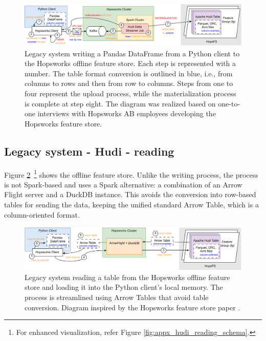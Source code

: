 \begin{figure}
    \begin{center}
      \includegraphics[width=\textwidth]{figures/2-background_and_related_work/hudi_write.png}
    \end{center}
    \caption[Legacy system - Hudi - write process]{Legacy system writing a Pandas DataFrame from a Python client to the Hopsworks offline feature store. Each step is represented with a number. The table format conversion is outlined in blue, i.e., from columns to rows and then from row to columns. Steps from one to four represent the upload process, while the materialization process is complete at step eight. The diagram was realized based on one-to-one interviews with Hopsworks AB employees developing the Hopsworks feature store.}
    \label{fig:hudi_write}
\end{figure}



\subsection{Legacy system - Hudi - reading}
\label{subsec:back_sys_hudi_read}

Figure \ref{fig:hudi_read}~\footnote{For enhanced visualization, refer Figure \ref{fig:appx_hudi_reading_schema}.}  shows the offline feature store. Unlike the writing process, the process is not Spark-based and uses a Spark alternative: a combination of an Arrow Flight server and a DuckDB instance. This avoids the conversion into row-based tables for sending the data, keeping the unified standard Arrow Table, which is a column-oriented format.

\begin{figure}
    \begin{center}
      \includegraphics[width=\textwidth]{figures/2-background_and_related_work/hudi_read.png}
    \end{center}
    \caption[Legacy system - Hudi - read process]{Legacy system reading a table from the Hopsworks offline feature store and loading it into the Python client's local memory. The process is streamlined using Arrow Tables that avoid table conversion. Diagram inspired by the Hopsworks feature store paper \cite{10.1145/3626246.3653389}.}
    \label{fig:hudi_read}
\end{figure}




